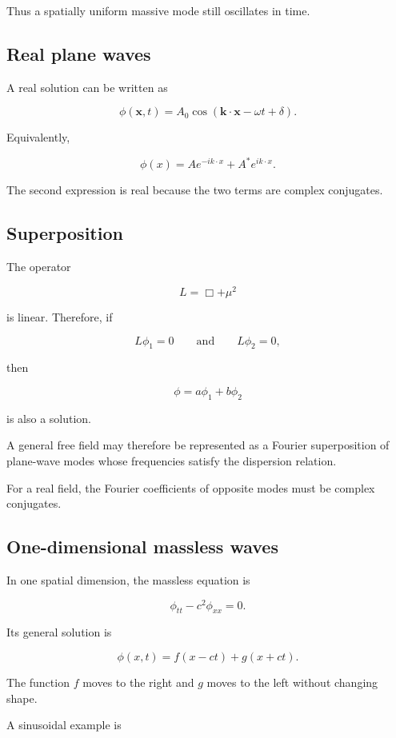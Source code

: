 Thus a spatially uniform massive mode still oscillates in time.

\subsection{Real plane waves}

A real solution can be written as

\[
\boxed{
\phi(\mathbf{x},t)
=
A_{0}
\cos
\left(
\mathbf{k}\cdot\mathbf{x}
-
\omega t
+
\delta
\right)
}.
\]

Equivalently,

\[
\phi(x)
=
A e^{-ik\cdot x}
+
A^{*}e^{ik\cdot x}.
\]

The second expression is real because the two terms are complex conjugates.

\subsection{Superposition}

The operator

\[
L=\Box+\mu^{2}
\]

is linear. Therefore, if

\[
L\phi_{1}=0
\qquad\text{and}\qquad
L\phi_{2}=0,
\]

then

\[
\boxed{
\phi=a\phi_{1}+b\phi_{2}
}
\]

is also a solution.

A general free field may therefore be represented as a Fourier superposition of plane-wave modes whose frequencies satisfy the dispersion relation.

For a real field, the Fourier coefficients of opposite modes must be complex conjugates.

\subsection{One-dimensional massless waves}

In one spatial dimension, the massless equation is

\[
\phi_{tt}-c^{2}\phi_{xx}=0.
\]

Its general solution is

\[
\boxed{
\phi(x,t)
=
f(x-ct)+g(x+ct)
}.
\]

The function \(f\) moves to the right and \(g\) moves to the left without changing shape.

A sinusoidal example is

